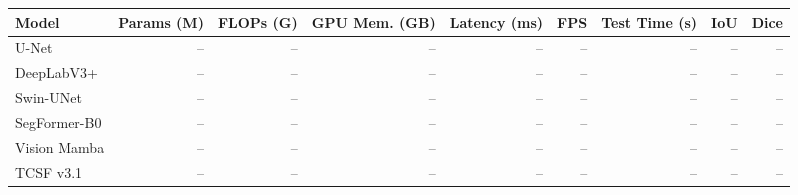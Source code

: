 \begin{tabular}{lrrrrrrrr}
\toprule
Model & Params (M) & FLOPs (G) & GPU Mem. (GB) & Latency (ms) & FPS & Test Time (s) & IoU & Dice \\
\midrule
U-Net & -- & -- & -- & -- & -- & -- & -- & -- \\
DeepLabV3+ & -- & -- & -- & -- & -- & -- & -- & -- \\
Swin-UNet & -- & -- & -- & -- & -- & -- & -- & -- \\
SegFormer-B0 & -- & -- & -- & -- & -- & -- & -- & -- \\
Vision Mamba & -- & -- & -- & -- & -- & -- & -- & -- \\
TCSF v3.1 & -- & -- & -- & -- & -- & -- & -- & -- \\
\bottomrule
\end{tabular}
